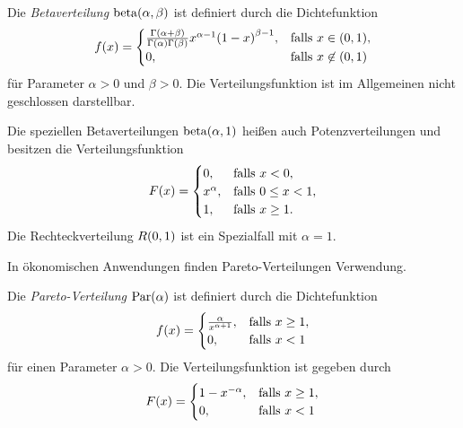 \documentclass{lecture}
\begin{document}
    \begin{definition}
        Die \emph{Betaverteilung} \(\betadist\parentheses*{\alpha, \beta}\) ist definiert durch die Dichtefunktion
        \[
            f\parentheses*{x} = \begin{cases}
                \frac{\Gamma\parentheses*{\alpha + \beta}}{\Gamma\parentheses*{\alpha}\Gamma\parentheses*{\beta}}x^{\alpha - 1}\parentheses*{1 - x}^{\beta - 1}, & \text{falls }x \in \parentheses*{0, 1},\\
                0, & \text{falls }x \not\in \parentheses*{0, 1}
            \end{cases}
        \]
        für Parameter \(\alpha > 0\) und \(\beta > 0\).
        Die Verteilungsfunktion ist im Allgemeinen nicht geschlossen darstellbar.
    \end{definition}

    Die speziellen Betaverteilungen \(\betadist\parentheses*{\alpha, 1}\) heißen auch Potenzverteilungen und besitzen die Verteilungsfunktion
    \[
        F\parentheses*{x} = \begin{cases}
            0, & \text{falls }x < 0,\\
            x^\alpha, & \text{falls }0 \le x < 1,\\
            1, & \text{falls }x \ge 1.
        \end{cases}
    \]
    Die Rechteckverteilung \(R\parentheses*{0, 1}\) ist ein Spezialfall mit \(\alpha = 1\).

    In ökonomischen Anwendungen finden Pareto-Verteilungen Verwendung.

    \begin{definition}
        Die \emph{Pareto-Verteilung} \(\Par\parentheses*{\alpha}\) ist definiert durch die Dichtefunktion
        \[
            f\parentheses*{x} = \begin{cases}
                \frac{\alpha}{x^{\alpha + 1}}, & \text{falls }x \ge 1,\\
                0, & \text{falls }x < 1
            \end{cases}
        \]
        für einen Parameter \(\alpha > 0\).
        Die Verteilungsfunktion ist gegeben durch
        \[
            F\parentheses*{x} = \begin{cases}
                1 - x^{-\alpha}, & \text{falls }x \ge 1,\\
                0, & \text{falls }x < 1
            \end{cases}
        \]
    \end{definition}
\end{document}
